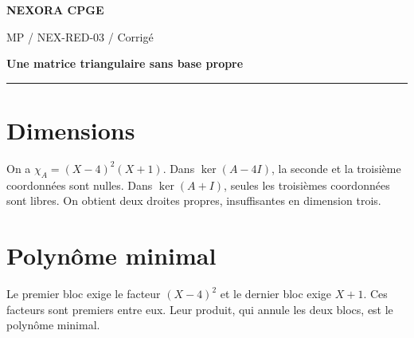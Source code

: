 \documentclass[11pt,a4paper]{article}
\begin{document}
{\small\bfseries\color{nexorablue} NEXORA CPGE}\par
{\small MP / NEX-RED-03 / Corrigé}\par
{\LARGE\bfseries Une matrice triangulaire sans base propre}\par
\vspace{0.25em}\hrule\vspace{0.6em}

\section*{Dimensions}
On a $\chi_A=(X-4)^2(X+1)$. Dans $\ker(A-4I)$, la seconde et la troisième coordonnées sont nulles. Dans $\ker(A+I)$, seules les troisièmes coordonnées sont libres. On obtient deux droites propres, insuffisantes en dimension trois.

\section*{Polynôme minimal}
Le premier bloc exige le facteur $(X-4)^2$ et le dernier bloc exige $X+1$. Ces facteurs sont premiers entre eux. Leur produit, qui annule les deux blocs, est le polynôme minimal.
\end{document}
